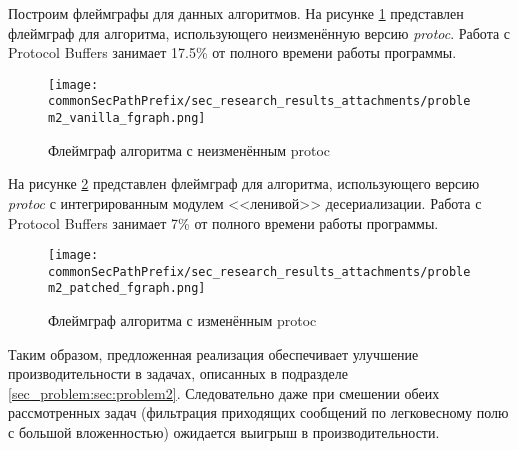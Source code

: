 Построим флеймграфы для данных алгоритмов.
На рисунке \ref{fig:problem2_vanilla_fgraph} представлен флеймграф для алгоритма, использующего неизменённую версию \textit{protoc}. 
Работа с Protocol Buffers занимает 17.5\% от полного времени работы программы.

\begin{figure}[H]
    \centering
    \texttt{[image: \\commonSecPathPrefix/sec\_research\_results\_attachments/problem2\_vanilla\_fgraph.png]}
    \caption{Флеймграф алгоритма с неизменённым protoc}
    \label{fig:problem2_vanilla_fgraph}
\end{figure}

На рисунке \ref{fig:problem2_patched_fgraph} представлен флеймграф для алгоритма, использующего версию \textit{protoc} с интегрированным модулем <<ленивой>> десериализации. 
Работа с Protocol Buffers занимает 7\% от полного времени работы программы.

\begin{figure}[H]
    \centering
    \texttt{[image: \\commonSecPathPrefix/sec\_research\_results\_attachments/problem2\_patched\_fgraph.png]}
    \caption{Флеймграф алгоритма с изменённым protoc}
    \label{fig:problem2_patched_fgraph}
\end{figure}

Таким образом, предложенная реализация обеспечивает улучшение производительности в задачах, описанных в подразделе \ref{sec_problem:sec:problem2}.
Следовательно даже при смешении обеих рассмотренных задач (фильтрация приходящих сообщений по легковесному полю с большой вложенностью) ожидается выигрыш в производительности.
